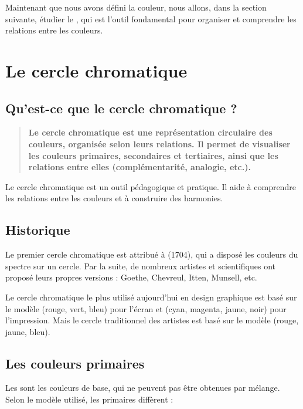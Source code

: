 Maintenant que nous avons défini la couleur, nous allons, dans la section suivante, étudier le , qui est l'outil fondamental pour organiser et comprendre les relations entre les couleurs.

\section{Le cercle chromatique}

\subsection{Qu'est-ce que le cercle chromatique ?}

\begin{quote}
\textbf{Le cercle chromatique est une représentation circulaire des couleurs, organisée selon leurs relations. Il permet de visualiser les couleurs primaires, secondaires et tertiaires, ainsi que les relations entre elles (complémentarité, analogie, etc.).}
\end{quote}

Le cercle chromatique est un outil pédagogique et pratique. Il aide à comprendre les relations entre les couleurs et à construire des harmonies.

\subsection{Historique}

Le premier cercle chromatique est attribué à  (1704), qui a disposé les couleurs du spectre sur un cercle. Par la suite, de nombreux artistes et scientifiques ont proposé leurs propres versions : Goethe, Chevreul, Itten, Munsell, etc.

Le cercle chromatique le plus utilisé aujourd'hui en design graphique est basé sur le modèle  (rouge, vert, bleu) pour l'écran et  (cyan, magenta, jaune, noir) pour l'impression. Mais le cercle traditionnel des artistes est basé sur le modèle  (rouge, jaune, bleu).

\subsection{Les couleurs primaires}

Les  sont les couleurs de base, qui ne peuvent pas être obtenues par mélange. Selon le modèle utilisé, les primaires diffèrent :

